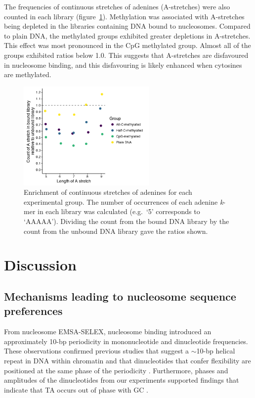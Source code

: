 \documentclass[a4paper, numbers=noenddot]{scrbook}
\begin{document}
The frequencies of continuous stretches of adenines (A-stretches) were also counted in each library (figure~\ref{fig:astretch}).  Methylation was associated with A-stretches being depleted in the libraries containing DNA bound to nucleosomes.  Compared to plain DNA, the methylated groups exhibited greater depletions in A-stretches.  This effect was most pronounced in the CpG methylated group.  Almost all of the groups exhibited ratios below 1.0.  This suggests that A-stretches are disfavoured in nucleosome binding, and this disfavouring is likely enhanced when cytosines are methylated.

\begin{figure}[htbp]
  \centering
  \includegraphics[width=0.6\textwidth]{astretch}
  \caption{Enrichment of continuous stretches of adenines for each experimental group.  The number of occurrences of each adenine \emph{k}-mer in each library was calculated (e.g.\ `5' corresponds to `AAAAA').  Dividing the count from the bound DNA library by the count from the unbound DNA library gave the ratios shown.}
  \label{fig:astretch}
\end{figure}

\section{Discussion}
\label{sec:emsaselex_discussion}

\subsection{Mechanisms leading to nucleosome sequence preferences}
\label{ssec:emsaselex_discussion_seqpref}

From nucleosome EMSA-SELEX, nucleosome binding introduced an approximately 10-bp periodicity in mononucleotide and dinucleotide frequencies.  These observations confirmed previous studies that suggest a $\sim$10-bp helical repeat in DNA within chromatin and that dinucleotides that confer flexibility are positioned at the same phase of the periodicity \citep{struhl_determinants_2013}.  Furthermore, phases and amplitudes of the dinucleotides from our experiments supported findings that indicate that TA occurs out of phase with GC \citep{struhl_determinants_2013}.
\end{document}
